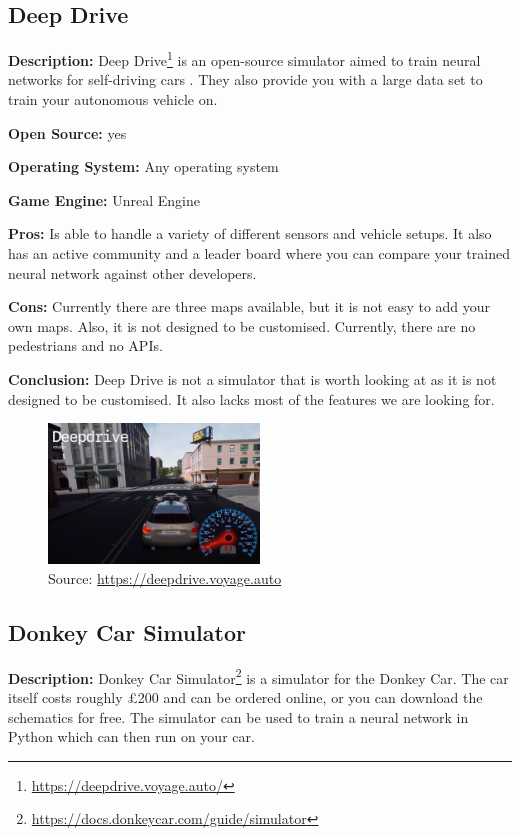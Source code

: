 \subsection{Deep Drive}
\textbf{Description:} Deep Drive\footnote{\url{https://deepdrive.voyage.auto/}} is an open-source simulator aimed to train neural networks for self-driving cars \cite{DeepDrive_Website}. They also provide you with a large data set to train your autonomous vehicle on. 

\textbf{Open Source:} yes

\textbf{Operating System:} Any operating system

\textbf{Game Engine:} Unreal Engine

\textbf{Pros:} Is able to handle a variety of different sensors and vehicle setups. It also has an active community and a leader board where you can compare your trained neural network against other developers. 

\textbf{Cons:} Currently there are three maps available, but it is not easy to add your own maps. Also, it is not designed to be customised. Currently, there are no pedestrians and no APIs.

\textbf{Conclusion:} Deep Drive is not a simulator that is worth looking at as it is not designed to be customised. It also lacks most of the features we are looking for. 

\begin{figure}[H]
    \centering
    \includegraphics[width=0.5\textwidth]{Simulators/DeepDrive.JPG}
    \caption{Source: \url{https://deepdrive.voyage.auto}}
\end{figure}

\subsection{Donkey Car Simulator}
\textbf{Description:} Donkey Car Simulator\footnote{\url{https://docs.donkeycar.com/guide/simulator}} is a simulator for the Donkey Car. The car itself costs roughly £200 and can be ordered online, or you can download the schematics for free. The simulator can be used to train a neural network in Python which can then run on your car. 

